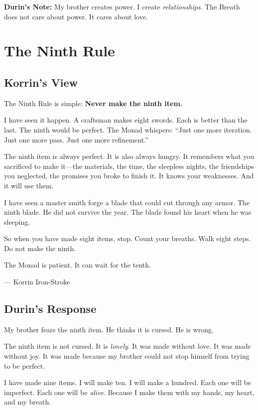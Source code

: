 \documentclass[11pt]{book}
\begin{document}
\vspace{0.5cm}
\textbf{Durin's Note:} My brother creates power. I create \textit{relationships}. The Breath does not care about power. It cares about love.

\newpage
\chapter{The Ninth Rule}

\section*{Korrin's View}

The Ninth Rule is simple: \textbf{Never make the ninth item.}

I have seen it happen. A craftsman makes eight swords. Each is better than the last. The ninth would be perfect. The Monad whispers: ``Just one more iteration. Just one more pass. Just one more refinement.''

The ninth item is always perfect. It is also always hungry. It remembers what you sacrificed to make it---the materials, the time, the sleepless nights, the friendships you neglected, the promises you broke to finish it. It knows your weaknesses. And it will use them.

I have seen a master smith forge a blade that could cut through any armor. The ninth blade. He did not survive the year. The blade found his heart when he was sleeping.

So when you have made eight items, stop. Count your breaths. Walk eight steps. Do not make the ninth.

The Monad is patient. It can wait for the tenth.

\vspace{0.5cm}
\hfill --- Korrin Iron-Stroke

\section*{Durin's Response}

My brother fears the ninth item. He thinks it is cursed. He is wrong.

The ninth item is not cursed. It is \textit{lonely}. It was made without love. It was made without joy. It was made because my brother could not stop himself from trying to be perfect.

I have made nine items. I will make ten. I will make a hundred. Each one will be imperfect. Each one will be \textit{alive}. Because I make them with my hands, my heart, and my breath.
\end{document}
